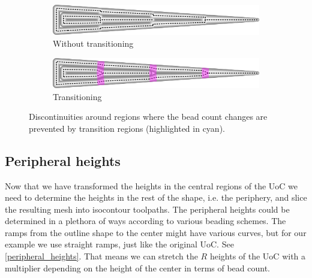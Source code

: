 \begin{figure}
\centering
\setlength{\figwidth}{\columnwidth}
\begin{subfigure}{0.9\figwidth}\centering
\includegraphics[width=\columnwidth]{sources/method/wedge_no_transitioning.png}
\caption{Without transitioning}
\end{subfigure}
\begin{subfigure}{0.9\figwidth}\centering
\includegraphics[width=\columnwidth]{sources/method/wedge_transitioning.png}
\caption{Transitioning}
\end{subfigure}
\caption{
Discontinuities around regions where the bead count changes are prevented by transition regions (highlighted in cyan).
}
\label{transitions}
\end{figure}














\subsection{Peripheral heights}\label{sec_peripheral_height_adjustment}
Now that we have transformed the heights in the central regions of the UoC we need to determine the heights in the rest of the shape, i.e. the periphery, and slice the resulting mesh into isocontour toolpaths.
The peripheral heights could be determined in a plethora of ways according to various beading schemes.
The ramps from the outline shape to the center might have various curves,
but for our example we use straight ramps, just like the original UoC.
See \cref{peripheral_heights}.
That means we can stretch the $R$ heights of the UoC with a multiplier depending on the height of the center in terms of bead count.


